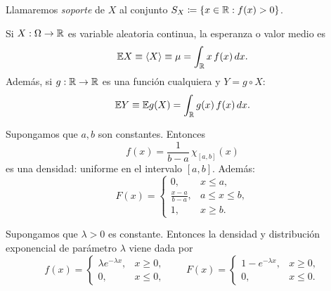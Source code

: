 \begin{definicion}[31]
Llamaremos \emph{soporte} de $X$ al conjunto $S_X \coloneqq \{x \in \mathbb{R} : f(x) > 0\}$.
\end{definicion}

\begin{proposicion}[56]
Si $X : \Omega \to \mathbb{R}$ es variable aleatoria continua, la esperanza o valor medio es
\[
  \mathbb{E} X \equiv \langle X \rangle \equiv \mu = \int_{\mathbb{R}} x\,f(x)\,dx.
\]
Además, si $g : \mathbb{R} \to \mathbb{R}$ es una función cualquiera y $Y = g \circ X$:
\[
  \mathbb{E} Y \equiv \mathbb{E} g(X) = \int_{\mathbb{R}} g(x)\,f(x)\,dx.
\]
\end{proposicion}

\begin{ejemplo}[30]
Supongamos que $a, b$ son constantes. Entonces
\[
  f(x) = \frac{1}{b-a}\,\chi_{[a,b]}(x)
\]
es una densidad: uniforme en el intervalo $[a,b]$. Además:
\[
  F(x) =
  \begin{cases}
    0, & x \le a, \\[4pt]
    \frac{x-a}{b-a}, & a \le x \le b, \\[4pt]
    1, & x \ge b.
  \end{cases}
\]
\end{ejemplo}

\begin{ejemplo}[31]
Supongamos que $\lambda > 0$ es constante. Entonces la densidad y distribución exponencial de parámetro $\lambda$ viene dada por
\[
  f(x) =
  \begin{cases}
    \lambda e^{-\lambda x}, & x \ge 0, \\
    0, & x \le 0,
  \end{cases}
  \qquad
  F(x) =
  \begin{cases}
    1 - e^{-\lambda x}, & x \ge 0, \\
    0, & x \le 0.
  \end{cases}
\]
\end{ejemplo}

